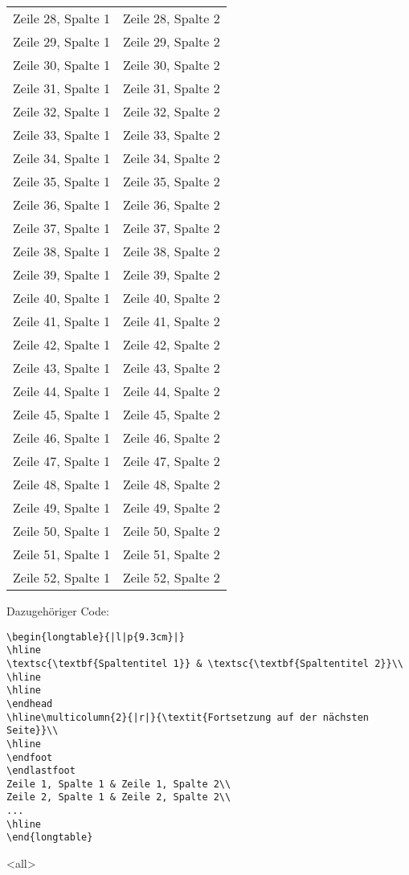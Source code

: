 \begin{frame}[fragile]
\begin{longtable}{|l|p{9.3cm}|}
Zeile 28, Spalte 1 & Zeile 28, Spalte 2\\
Zeile 29, Spalte 1 & Zeile 29, Spalte 2\\
Zeile 30, Spalte 1 & Zeile 30, Spalte 2\\
Zeile 31, Spalte 1 & Zeile 31, Spalte 2\\
Zeile 32, Spalte 1 & Zeile 32, Spalte 2\\
Zeile 33, Spalte 1 & Zeile 33, Spalte 2\\
Zeile 34, Spalte 1 & Zeile 34, Spalte 2\\
Zeile 35, Spalte 1 & Zeile 35, Spalte 2\\
Zeile 36, Spalte 1 & Zeile 36, Spalte 2\\
Zeile 37, Spalte 1 & Zeile 37, Spalte 2\\
Zeile 38, Spalte 1 & Zeile 38, Spalte 2\\
Zeile 39, Spalte 1 & Zeile 39, Spalte 2\\
Zeile 40, Spalte 1 & Zeile 40, Spalte 2\\
Zeile 41, Spalte 1 & Zeile 41, Spalte 2\\
Zeile 42, Spalte 1 & Zeile 42, Spalte 2\\
Zeile 43, Spalte 1 & Zeile 43, Spalte 2\\
Zeile 44, Spalte 1 & Zeile 44, Spalte 2\\
Zeile 45, Spalte 1 & Zeile 45, Spalte 2\\
Zeile 46, Spalte 1 & Zeile 46, Spalte 2\\
Zeile 47, Spalte 1 & Zeile 47, Spalte 2\\
Zeile 48, Spalte 1 & Zeile 48, Spalte 2\\
Zeile 49, Spalte 1 & Zeile 49, Spalte 2\\
Zeile 50, Spalte 1 & Zeile 50, Spalte 2\\
Zeile 51, Spalte 1 & Zeile 51, Spalte 2\\
Zeile 52, Spalte 1 & Zeile 52, Spalte 2\\
\hline
\end{longtable}

Dazugehöriger Code:

\begin{lstlisting}
\begin{longtable}{|l|p{9.3cm}|}
\hline
\textsc{\textbf{Spaltentitel 1}} & \textsc{\textbf{Spaltentitel 2}}\\
\hline
\hline
\endhead
\hline\multicolumn{2}{|r|}{\textit{Fortsetzung auf der nächsten Seite}}\\
\hline
\endfoot
\endlastfoot
Zeile 1, Spalte 1 & Zeile 1, Spalte 2\\
Zeile 2, Spalte 1 & Zeile 2, Spalte 2\\
...
\hline
\end{longtable}
\end{lstlisting}

\mode
<all>

\end{frame}
\newpage

